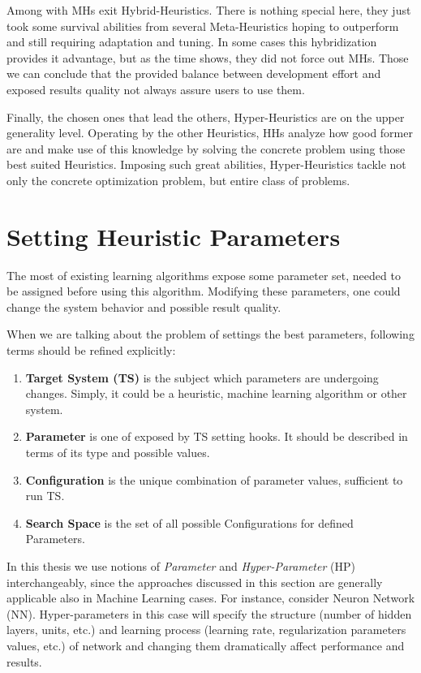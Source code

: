 Among with MHs exit Hybrid-Heuristics. There is nothing special here, they just took some survival abilities from several Meta-Heuristics hoping to outperform and still requiring adaptation and tuning. In some cases this hybridization provides it advantage, but as the time shows, they did not force out MHs. Those we can conclude that the provided balance between development effort and exposed results quality not always assure users to use them.

Finally, the chosen ones that lead the others, Hyper-Heuristics are on the upper generality level. 
Operating by the other Heuristics, HHs analyze how good former are and make use of this knowledge by solving the concrete problem using those best suited Heuristics. Imposing such great abilities, Hyper-Heuristics tackle not only the concrete optimization problem, but entire class of problems.


\section{Setting Heuristic Parameters}\label{bg: Setting Heuristic Parameters}
The most of existing learning algorithms expose some parameter set, needed to be assigned before using this algorithm. Modifying these parameters, one could change the system behavior and possible result quality.

When we are talking about the problem of settings the best parameters, following terms should be refined explicitly:
\begin{enumerate}
	\item \textbf{Target System (TS)} is the subject which parameters are undergoing changes. Simply, it could be a heuristic, machine learning algorithm or other system.
	\item \textbf{Parameter} is one of exposed by TS setting hooks. It should be described in terms of its type and possible values.
	\item \textbf{Configuration} is the unique combination of parameter values, sufficient to run TS.
	\item \textbf{Search Space} is the set of all possible Configurations for defined Parameters.
\end{enumerate}

In this thesis we use notions of \textit{Parameter} and \textit{Hyper-Parameter} (HP) interchangeably, since the approaches discussed in this section are generally applicable also in Machine Learning cases. For instance, consider Neuron Network (NN). Hyper-parameters in this case will specify the structure (number of hidden layers, units, etc.) and learning process (learning rate, regularization parameters values, etc.) of network and changing them dramatically affect performance and results.

